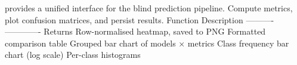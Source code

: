 {} provides a unified  interface\markdownRendererSoftLineBreak
{}for the blind prediction pipeline.\markdownRendererInterblockSeparator
{}\markdownRendererThematicBreak{}\markdownRendererInterblockSeparator
{}
\markdownRendererSectionEnd \markdownRendererSectionBegin
{}\markdownRendererInterblockSeparator
{} Compute metrics, plot confusion matrices, and persist results.\markdownRendererParagraphSeparator
{}\markdownRendererPipe{} Function \markdownRendererPipe{} Description \markdownRendererPipe{}\markdownRendererSoftLineBreak
{}\markdownRendererPipe{}----------\markdownRendererPipe{}-------------\markdownRendererPipe{}\markdownRendererSoftLineBreak
{}\markdownRendererPipe{}  \markdownRendererPipe{} Returns  \markdownRendererPipe{}\markdownRendererSoftLineBreak
{}\markdownRendererPipe{}  \markdownRendererPipe{} Row-normalised heatmap, saved to PNG \markdownRendererPipe{}\markdownRendererSoftLineBreak
{}\markdownRendererPipe{}  \markdownRendererPipe{} Formatted comparison table \markdownRendererPipe{}\markdownRendererSoftLineBreak
{}\markdownRendererPipe{}  \markdownRendererPipe{} Grouped bar chart of models × metrics \markdownRendererPipe{}\markdownRendererSoftLineBreak
{}\markdownRendererPipe{}  \markdownRendererPipe{} Class frequency bar chart (log scale) \markdownRendererPipe{}\markdownRendererSoftLineBreak
{}\markdownRendererPipe{}  \markdownRendererPipe{} Per-class histograms \markdownRendererPipe{}\markdownRendererSoftLineBreak
